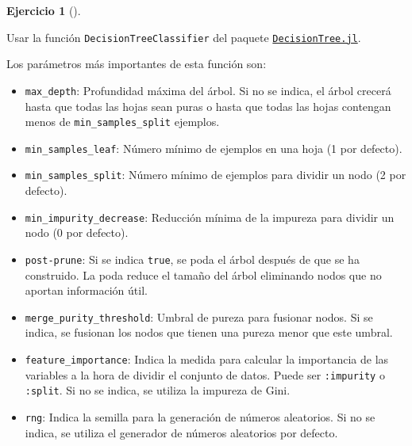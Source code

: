 \documentclass[
  a4paper,
]{scrreport}
\providecommand{\tightlist}{%
  \setlength{\itemsep}{0pt}\setlength{\parskip}{0pt}}\usepackage{longtable,booktabs,array}
\theoremstyle{definition}
\newtheorem{exercise}{Ejercicio}[chapter]
\theoremstyle{remark}
\begin{document}
\begin{exercise}[]
\begin{enumerate}
  \begin{tcolorbox}[enhanced jigsaw, toptitle=1mm, breakable, toprule=.15mm, opacitybacktitle=0.6, coltitle=black, titlerule=0mm, arc=.35mm, title=\textcolor{quarto-callout-note-color}{\faInfo}\hspace{0.5em}{Ayuda}, rightrule=.15mm, opacityback=0, colback=white, bottomrule=.15mm, leftrule=.75mm, colbacktitle=quarto-callout-note-color!10!white, bottomtitle=1mm, colframe=quarto-callout-note-color-frame, left=2mm]

  Usar la función \texttt{DecisionTreeClassifier} del paquete
  \href{https://docs.juliahub.com/DecisionTree/}{\texttt{DecisionTree.jl}}.

  Los parámetros más importantes de esta función son:

  \begin{itemize}
  \tightlist
  \item
    \texttt{max\_depth}: Profundidad máxima del árbol. Si no se indica,
    el árbol crecerá hasta que todas las hojas sean puras o hasta que
    todas las hojas contengan menos de \texttt{min\_samples\_split}
    ejemplos.
  \item
    \texttt{min\_samples\_leaf}: Número mínimo de ejemplos en una hoja
    (1 por defecto).
  \item
    \texttt{min\_samples\_split}: Número mínimo de ejemplos para dividir
    un nodo (2 por defecto).
  \item
    \texttt{min\_impurity\_decrease}: Reducción mínima de la impureza
    para dividir un nodo (0 por defecto).
  \item
    \texttt{post-prune}: Si se indica \texttt{true}, se poda el árbol
    después de que se ha construido. La poda reduce el tamaño del árbol
    eliminando nodos que no aportan información útil.
  \item
    \texttt{merge\_purity\_threshold}: Umbral de pureza para fusionar
    nodos. Si se indica, se fusionan los nodos que tienen una pureza
    menor que este umbral.
  \item
    \texttt{feature\_importance}: Indica la medida para calcular la
    importancia de las variables a la hora de dividir el conjunto de
    datos. Puede ser \texttt{:impurity} o \texttt{:split}. Si no se
    indica, se utiliza la impureza de Gini.
  \item
    \texttt{rng}: Indica la semilla para la generación de números
    aleatorios. Si no se indica, se utiliza el generador de números
    aleatorios por defecto.
  \end{itemize}


\end{tcolorbox}
\end{enumerate}
\end{exercise}
\end{document}
